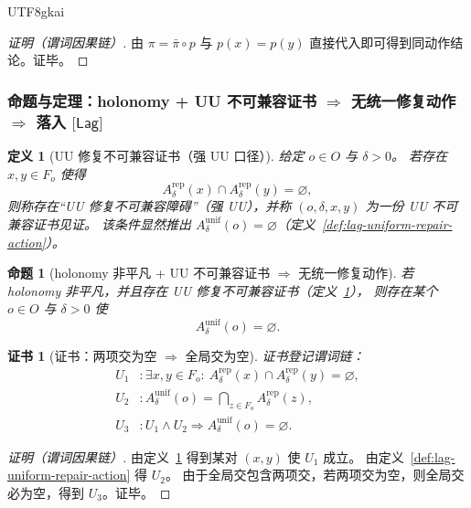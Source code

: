 \documentclass[12pt]{article}
\newtheorem{definition}{定义}[section]
\newtheorem{proposition}{命题}[section]
\newtheorem{Certificate}{证书}[section]
\begin{document}
\begin{CJK*}{UTF8}{gkai}
\begin{proof}[证明（谓词因果链）]
由 $\pi=\bar\pi\circ p$ 与 $p(x)=p(y)$ 直接代入即可得到同动作结论。证毕。
\end{proof}

\subsubsection{命题与定理：holonomy + UU 不可兼容证书 $\Rightarrow$ 无统一修复动作 $\Rightarrow$ 落入 $\lbrack\mathsf{Lag}\rbrack$}
\label{sec:lag-holonomy-theorem}

\begin{definition}[UU 修复不可兼容证书（强 UU 口径）]
\label{def:lag-uu-repair-incompatibility}
给定 $o\in O$ 与 $\delta>0$。
若存在 $x,y\in F_o$ 使得
\[
  A^{\mathrm{rep}}_{\delta}(x)\cap A^{\mathrm{rep}}_{\delta}(y)=\varnothing,
\]
则称存在“UU 修复不可兼容障碍”（强 UU），并称 $(o,\delta,x,y)$ 为一份 UU 不可兼容证书见证。
该条件显然推出 $A^{\mathrm{unif}}_{\delta}(o)=\varnothing$（定义~\ref{def:lag-uniform-repair-action}）。
\end{definition}

\begin{proposition}[holonomy 非平凡 + UU 不可兼容证书 $\Rightarrow$ 无统一修复动作]
\label{prop:lag-holonomy-implies-no-unif-repair}
若 holonomy 非平凡，并且存在 UU 修复不可兼容证书（定义~\ref{def:lag-uu-repair-incompatibility}），
则存在某个 $o\in O$ 与 $\delta>0$ 使
\[
  A^{\mathrm{unif}}_{\delta}(o)=\varnothing.
\]
\end{proposition}

\begin{Certificate}[证书：两项交为空 $\Rightarrow$ 全局交为空]
\label{cert:lag-holonomy-implies-no-unif-repair}
证书登记谓词链：
\[
\begin{aligned}
  U_1 &: \exists x,y\in F_o:\ A^{\mathrm{rep}}_{\delta}(x)\cap A^{\mathrm{rep}}_{\delta}(y)=\varnothing,\\
  U_2 &: A^{\mathrm{unif}}_{\delta}(o)=\bigcap_{z\in F_o}A^{\mathrm{rep}}_{\delta}(z),\\
  U_3 &: U_1\wedge U_2\Rightarrow A^{\mathrm{unif}}_{\delta}(o)=\varnothing.
\end{aligned}
\]
\end{Certificate}

\begin{proof}[证明（谓词因果链）]
由定义~\ref{def:lag-uu-repair-incompatibility} 得到某对 $(x,y)$ 使 $U_1$ 成立。
由定义~\ref{def:lag-uniform-repair-action} 得 $U_2$。
由于全局交包含两项交，若两项交为空，则全局交必为空，得到 $U_3$。证毕。
\end{proof}


\end{CJK*}
\end{document}
